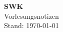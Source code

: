 \documentclass[12pt, a4paper]{article}
\begin{document}
\begin{center}
  {\LARGE\bfseries SWK}\\[6pt]
  {\large Vorlesungsnotizen}\\[4pt]
  {\small Stand: \today}
\end{center}

\vspace{1em}
\tableofcontents
\newpage

\end{document}
